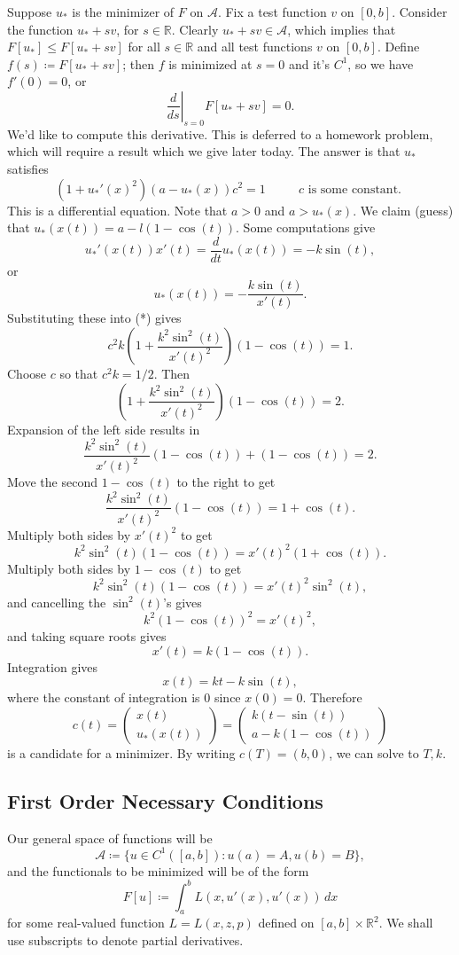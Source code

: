\documentclass[11pt]{article}
\newcommand{\R}{\mathbb{R}}
\begin{document}
Suppose $u_*$ is the minimizer of $F$ on $\mathcal{A}$. Fix a test function $v$ on $[0,b]$. Consider the function $u_* + sv$, for $s \in \R$. Clearly $u_* + sv \in \mathcal{A}$, which implies that $F[u_*] \leq F[u_* + sv]$ for all $s \in \R$ and all test functions $v$ on $[0, b]$. Define $f(s) \coloneqq F[u_* + sv]$; then $f$ is minimized at $s = 0$ and it's $C^1$, so we have $f'(0) = 0$, or
\[
\left. \frac{d}{ds} \right|_{s = 0} F[u_* + sv] = 0.
\]
We'd like to compute this derivative. This is deferred to a homework problem, which will require a result which we give later today. The answer is that $u_*$ satisfies
\[
\tag{*}
(1 + u_*'(x)^2)(a - u_*(x))c^2 = 1 \qquad \text{ $c$ is some constant. }
\]
This is a differential equation. Note that $a > 0$ and $a > u_*(x)$. We claim (guess) that $u_*(x(t)) = a - l(1 - \cos(t))$. Some computations give
\[
u_*'(x(t))x'(t) = \frac{d}{dt} u_*(x(t)) = -k \sin(t),
\]
or
\[
u_*(x(t)) = -\frac{k\sin(t)}{x'(t)}.
\]
Substituting these into (*) gives
\[
c^2 k \left( 1 + \frac{k^2\sin^2(t)}{x'(t)^2} \right)(1 - \cos(t)) = 1.
\]
Choose $c$ so that $c^2k = 1/2$. Then
\[
\left( 1 + \frac{k^2\sin^2(t)}{x'(t)^2} \right)(1 - \cos(t)) = 2.
\]
Expansion of the left side results in
\[
\frac{k^2 \sin^2(t)}{x'(t)^2}(1 - \cos(t)) + (1 - \cos(t)) = 2.
\]
Move the second $1 - \cos(t)$ to the right to get
\[
\frac{k^2 \sin^2(t)}{x'(t)^2}(1 - \cos(t)) = 1 + \cos(t).
\]
Multiply both sides by $x'(t)^2$ to get
\[
k^2 \sin^2(t)(1 - \cos(t)) = x'(t)^2(1 + \cos(t)).
\]
Multiply both sides by $1 - \cos(t)$ to get
\[
k^2 \sin^2(t)(1 - \cos(t)) = x'(t)^2 \sin^2(t),
\]
and cancelling the $\sin^2(t)$'s gives
\[
k^2 (1 - \cos(t))^2 = x'(t)^2,
\]
and taking square roots gives
\[
x'(t) = k(1 - \cos(t)).
\]
Integration gives
\[
x(t) = kt - k\sin(t),
\]
where the constant of integration is $0$ since $x(0) = 0$. Therefore
\[
c(t) = \begin{pmatrix}
x(t) \\ u_*(x(t))
\end{pmatrix} = \begin{pmatrix}
k(t - \sin(t)) \\
a - k(1 - \cos(t))
\end{pmatrix}
\]
is a candidate for a minimizer. By writing $c(T) = (b,0)$, we can solve to $T,k$.

\subsection{First Order Necessary Conditions}

Our general space of functions will be 
\[
\mathcal{A} \coloneqq \{ u \in C^1([a,b]) : u(a) = A, u(b) = B \},
\]
and the functionals to be minimized will be of the form
\[
F[u] \coloneqq \int_a^b L(x,u'(x), u'(x)) \, dx
\]
for some real-valued function $L = L(x,z,p)$ defined on $[a,b] \times \R^2$. We shall use subscripts to denote partial derivatives.
\end{document}
